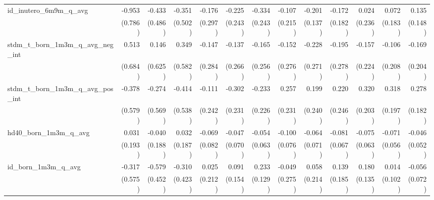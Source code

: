 \begin{tabular}{lrrrrrrrrrrrr}
id\_inutero\_6m9m\_q\_avg                   &       -0.953 &       -0.433 &       -0.351 &       -0.176 &       -0.225 &       -0.334 &       -0.107 &       -0.201 &       -0.172 &        0.024 &        0.072 &        0.135 \\ 
                                            &      (0.786) &      (0.486) &      (0.502) &      (0.297) &      (0.243) &      (0.243) &      (0.215) &      (0.137) &      (0.182) &      (0.236) &      (0.183) &      (0.148) \\ 
stdm\_t\_born\_1m3m\_q\_avg\_neg\_int       &        0.513 &        0.146 &        0.349 &       -0.147 &       -0.137 &       -0.165 &       -0.152 &       -0.228 &       -0.195 &       -0.157 &       -0.106 &       -0.169 \\ 
                                            &      (0.684) &      (0.625) &      (0.582) &      (0.284) &      (0.266) &      (0.256) &      (0.276) &      (0.271) &      (0.278) &      (0.224) &      (0.208) &      (0.204) \\ 
stdm\_t\_born\_1m3m\_q\_avg\_pos\_int       &       -0.378 &       -0.274 &       -0.414 &       -0.111 &       -0.302 &       -0.233 &        0.257 &        0.199 &        0.220 &        0.320 &        0.318 &        0.278 \\ 
                                            &      (0.579) &      (0.569) &      (0.538) &      (0.242) &      (0.231) &      (0.226) &      (0.231) &      (0.240) &      (0.246) &      (0.203) &      (0.197) &      (0.182) \\ 
hd40\_born\_1m3m\_q\_avg                    &        0.031 &       -0.040 &        0.032 &       -0.069 &       -0.047 &       -0.054 &       -0.100 &       -0.064 &       -0.081 &       -0.075 &       -0.071 &       -0.046 \\ 
                                            &      (0.193) &      (0.188) &      (0.187) &      (0.082) &      (0.070) &      (0.063) &      (0.076) &      (0.071) &      (0.067) &      (0.063) &      (0.056) &      (0.052) \\ 
id\_born\_1m3m\_q\_avg                      &       -0.317 &       -0.579 &       -0.310 &        0.025 &        0.091 &        0.233 &       -0.049 &        0.058 &        0.139 &        0.180 &        0.014 &       -0.056 \\ 
                                            &      (0.575) &      (0.452) &      (0.423) &      (0.212) &      (0.154) &      (0.129) &      (0.275) &      (0.214) &      (0.185) &      (0.135) &      (0.102) &      (0.072) \\ 

\end{tabular}
